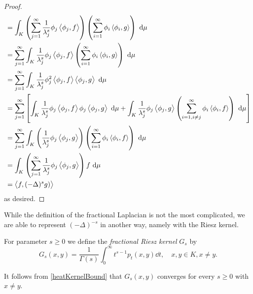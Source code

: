 \begin{proof}
\begin{align}
		&=\int_{K} \left(\sum_{j = 1}^{\infty} \frac{1}{\lambda_{j}^{s}} \phi_j \inn{\phi_j}{f} \right) \left(\sum_{i = 1}^{\infty} \phi_i \inn{\phi_i}{g}\right) \dd \mu \\
		&= \sum_{j = 1}^{\infty} \int_{K} \frac{1}{\lambda_j^s}\phi_j \inn{\phi_j}{f}\left(\sum_{i = 1}^{\infty} \phi_i \inn{\phi_i}{g}\right) \dd \mu \\
		&= \sum_{j =1}^{\infty} \int_{K} \frac{1}{\lambda_j^{s}} \phi_j^2 \inn{\phi_j}{f}\inn{\phi_j}{g} \dd \mu \\
		&= \sum_{j = 1}^{\infty} \left[\int_{K} \frac{1}{\lambda_j^{s}} \phi_j \inn{\phi_j}{f} \phi_j\inn{\phi_j}{g} \dd \mu + \int_{K}\frac{1}{\lambda_j^{s}}\phi_j\inn{\phi_j}{g} \left(\sum_{i = 1, i \neq j}^{\infty} \phi_i \inn{\phi_i}{f}\right) \dd \mu\right] \\
		&= \sum_{j=1}^{\infty} \int_{K}\left(\frac{1}{\lambda_j^{s}}\phi_j\inn{\phi_j}{g}\right)\left(\sum_{i = 1}^{\infty} \phi_i \inn{\phi_i}{f}\right) \dd \mu \\
		& = \int_{K} \left(\sum_{j = 1}^{\infty} \frac{1}{\lambda_j^s} \phi_j \inn{\phi_j}{g}\right) f \dd \mu \\
		&= \inn{f}{(-\Delta)^sg)}
	\end{align}
	as desired.
\end{proof}
While the definition of the fractional Laplacian is not the most complicated, we are able to represent $(-\Delta)^{-s}$ in another way, namely with the Riesz kernel.

\medskip
\begin{defi}\label{fractionalRieszKernel}
	For parameter $s \geq 0$ we define the \emph{fractional Riesz kernel} $G_s$ by
	\begin{equation}
		G_{s}(x,y) = \frac{1}{\Gamma(s)}\int_{0}^{\infty} t^{s-1}p_t(x,y) \dd t, \quad x, y \in K, x \neq y.
	\end{equation}
\end{defi}
\begin{remark}
	It follows from \eqref{heatKernelBound} that $G_s(x,y)$ converges for every $s \geq 0$ with $x \neq y$.
\end{remark}

